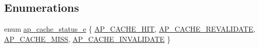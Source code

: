 \subsection*{Enumerations}
\begin{DoxyCompactItemize}
\item 
enum \hyperlink{group__MOD__CACHE_ga867e7fa27c3e0b612302472979849418}{ap\+\_\+cache\+\_\+status\+\_\+e} \{ \hyperlink{group__MOD__CACHE_gga867e7fa27c3e0b612302472979849418aca6fc649c9fd4e686e2551134d92bc53}{A\+P\+\_\+\+C\+A\+C\+H\+E\+\_\+\+H\+IT}, 
\hyperlink{group__MOD__CACHE_gga867e7fa27c3e0b612302472979849418a4088313cdf09ea437ce07e6240e417e6}{A\+P\+\_\+\+C\+A\+C\+H\+E\+\_\+\+R\+E\+V\+A\+L\+I\+D\+A\+TE}, 
\hyperlink{group__MOD__CACHE_gga867e7fa27c3e0b612302472979849418addcbc5ac2ab6f50c600c9f769a9db5d6}{A\+P\+\_\+\+C\+A\+C\+H\+E\+\_\+\+M\+I\+SS}, 
\hyperlink{group__MOD__CACHE_gga867e7fa27c3e0b612302472979849418a85ffd5041c638d8673f691378e812a32}{A\+P\+\_\+\+C\+A\+C\+H\+E\+\_\+\+I\+N\+V\+A\+L\+I\+D\+A\+TE}
 \}
\end{DoxyCompactItemize}
